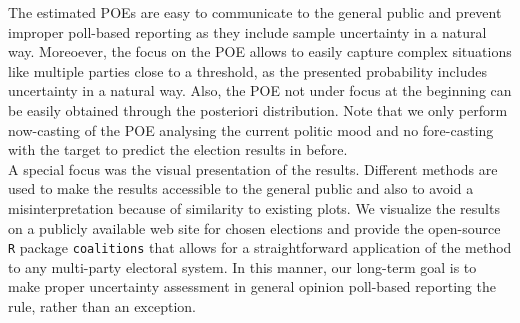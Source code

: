 \documentclass[smallcondensed]{svjour3}     %
\begin{document}
The estimated POEs are easy to communicate to the general public and prevent
improper poll-based reporting as they include sample uncertainty in a natural way.
Moreoever, the focus on the POE allows to easily capture complex situations
like multiple parties close to a threshold, as the presented probability
includes uncertainty in a natural way. Also, the POE not under focus at the beginning
can be easily obtained through the posteriori distribution.
Note that we only perform now-casting of the POE analysing the current
politic mood and no fore-casting with the target to predict the election results in before.\\



A special focus was the visual presentation of the results. Different methods are used to make the results accessible to the general public and also to avoid a misinterpretation because of similarity to existing plots. We visualize the results on a publicly available web site for chosen elections and provide the open-source \texttt{R} package \texttt{coalitions} that allows for a straightforward application of the method to any multi-party electoral system. In this manner, our long-term goal is to make proper uncertainty assessment in general opinion poll-based reporting the rule, rather than an exception.
\end{document}

